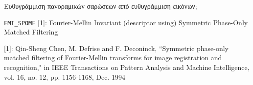 \begin{frame}{Ευθυγράμμιση πανοραμικών σαρώσεων από ευθυγράμμιση εικόνων;}

  {\small
  \texttt{FMI\_SPOMF} [1]: Fourier-Mellin Invariant (descriptor using) Symmetric Phase-Only Matched Filtering
  }

  \begin{figure}
    
  \end{figure}

  \placebottom
  \tiny
  [1]: Qin-Sheng Chen, M. Defrise and F. Deconinck, ``Symmetric phase-only matched filtering of Fourier-Mellin transforms for image registration and recognition," in IEEE Transactions on Pattern Analysis and Machine Intelligence, vol. 16, no. 12, pp. 1156-1168, Dec. 1994


\end{frame}
